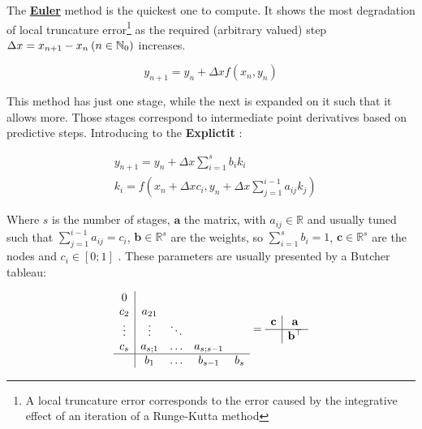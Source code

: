 The \underline{\textbf{Euler}} method is the quickest one to compute. It shows the most degradation of local truncature error\footnote{A local truncature error corresponds to the error caused by the integrative effect of an iteration of a Runge-Kutta method} as the required (arbitrary valued) step \(\Delta x = x_{n+1} - x_n \hspace{0.2em} (n \in \mathbb{N}_0)\) increases.

\begin{equation}
    y_{n+1} = y_{n} + \Delta x f(x_{n}, y_{n})
    \label{eq:Euler_Method}
\end{equation}

This method has just one stage, while the next is expanded on it such that it allows more. Those stages correspond to intermediate point derivatives based on predictive steps. Introducing to the \textbf{Explictit } \label{subsubsub:RK_Explicit}:

\begin{subequations}
    \begin{align}
        &y_{n+1} = y_n + \Delta x \sum^s_{i=1}b_i k_i \label{eq:Update_RKbased} \\
        &k_i = f(x_n + \Delta x c_i, y_n + \Delta x \sum^{i-1}_{j=1} a_{ij}k_j) \label{eq:Derivatives_Explicit-RK}  
    \end{align}
    \label{eq:Explicit-RK}  
\end{subequations}

Where \(s\) is the number of stages, \(\mathbf{a}\) the  matrix, with \(a_{ij} \in \mathbb{R}\) and usually tuned such that \(\sum^{i-1}_{j=1} a_{ij} = c_i\), \(\mathbf{b} \in \mathbb{R}^s\) are the weights, so \(\sum^s_{i=1} b_i = 1\), \(\mathbf{c} \in \mathbb{R}^s\) are the nodes and \(c_i \in [0;1]\) . These parameters are usually presented by a Butcher tableau:

\begin{equation}
    \begin{array}{c|cccc}
        0\\
        c_2 & a_{21}\\
        \vdots & \vdots &\ddots \\
        c_s & a_{s;1} & \hdots & a_{s;s-1}\\
        \hline
        & b_1 & \hdots & b_{s-1} & b_s  
    \end{array} = 
    \begin{array}{c|c}
        \mathbf{c} & \mathbf{a} \\
        \hline
        & \mathbf{b}^\top  
    \end{array}
    \label{eq:Explicit_Butcher_Tableu}
\end{equation}


